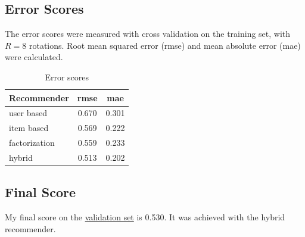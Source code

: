 \documentclass[11pt]{scrartcl}
\begin{document}
\subsection{Error Scores}
The error scores were measured with cross validation on the training set, with $R = 8$ rotations.
Root mean squared error (rmse) and mean absolute error (mae) were calculated.
\begin{table}[!htb]
	\centering
	\begin{tabular}{|l|c|c|}
		\hline
		Recommender   & rmse  & mae   \\\hline\hline
		user based    & 0.670 & 0.301 \\\hline
		item based    & 0.569 & 0.222 \\\hline
		factorization & 0.559 & 0.233 \\\hline
		hybrid        & 0.513 & 0.202 \\\hline
	\end{tabular}
	\caption{Error scores}\label{tab:errors}
\end{table}
\subsection{Final Score}
My final score on the \href{http://csujena.pythonanywhere.com/}{validation set} is 0.530.
It was achieved with the hybrid recommender.


% 
% 
\end{document}
